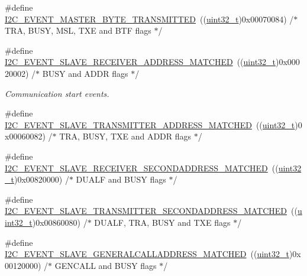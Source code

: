 \begin{DoxyCompactItemize}
\item 
\#define \hyperlink{group___i2_c___events_ga8fe3b96b54e3c38e1de5d48536039c8f}{I2\+C\+\_\+\+E\+V\+E\+N\+T\+\_\+\+M\+A\+S\+T\+E\+R\+\_\+\+B\+Y\+T\+E\+\_\+\+T\+R\+A\+N\+S\+M\+I\+T\+T\+ED}~((\hyperlink{_p_e___types_8h_a33594304e786b158f3fb30289278f5af}{uint32\+\_\+t})0x00070084)  /$\ast$ T\+R\+A, B\+U\+S\+Y, M\+S\+L, T\+X\+E and B\+T\+F flags $\ast$/
\item 
\#define \hyperlink{group___i2_c___events_ga6cf0e334704618b024eee604849f50f7}{I2\+C\+\_\+\+E\+V\+E\+N\+T\+\_\+\+S\+L\+A\+V\+E\+\_\+\+R\+E\+C\+E\+I\+V\+E\+R\+\_\+\+A\+D\+D\+R\+E\+S\+S\+\_\+\+M\+A\+T\+C\+H\+ED}~((\hyperlink{_p_e___types_8h_a33594304e786b158f3fb30289278f5af}{uint32\+\_\+t})0x00020002) /$\ast$ B\+U\+S\+Y and A\+D\+D\+R flags $\ast$/
\begin{DoxyCompactList}\small\item\em Communication start events. \end{DoxyCompactList}\item 
\#define \hyperlink{group___i2_c___events_ga3fa381c1fd9a95c8ae13c6cc402b1327}{I2\+C\+\_\+\+E\+V\+E\+N\+T\+\_\+\+S\+L\+A\+V\+E\+\_\+\+T\+R\+A\+N\+S\+M\+I\+T\+T\+E\+R\+\_\+\+A\+D\+D\+R\+E\+S\+S\+\_\+\+M\+A\+T\+C\+H\+ED}~((\hyperlink{_p_e___types_8h_a33594304e786b158f3fb30289278f5af}{uint32\+\_\+t})0x00060082) /$\ast$ T\+R\+A, B\+U\+S\+Y, T\+X\+E and A\+D\+D\+R flags $\ast$/
\item 
\#define \hyperlink{group___i2_c___events_ga17e78ab01fa980b3df10f8d9f6864c48}{I2\+C\+\_\+\+E\+V\+E\+N\+T\+\_\+\+S\+L\+A\+V\+E\+\_\+\+R\+E\+C\+E\+I\+V\+E\+R\+\_\+\+S\+E\+C\+O\+N\+D\+A\+D\+D\+R\+E\+S\+S\+\_\+\+M\+A\+T\+C\+H\+ED}~((\hyperlink{_p_e___types_8h_a33594304e786b158f3fb30289278f5af}{uint32\+\_\+t})0x00820000)  /$\ast$ D\+U\+A\+L\+F and B\+U\+S\+Y flags $\ast$/
\item 
\#define \hyperlink{group___i2_c___events_ga6221aa204356bec9146f800ccfc99fc1}{I2\+C\+\_\+\+E\+V\+E\+N\+T\+\_\+\+S\+L\+A\+V\+E\+\_\+\+T\+R\+A\+N\+S\+M\+I\+T\+T\+E\+R\+\_\+\+S\+E\+C\+O\+N\+D\+A\+D\+D\+R\+E\+S\+S\+\_\+\+M\+A\+T\+C\+H\+ED}~((\hyperlink{_p_e___types_8h_a33594304e786b158f3fb30289278f5af}{uint32\+\_\+t})0x00860080)  /$\ast$ D\+U\+A\+L\+F, T\+R\+A, B\+U\+S\+Y and T\+X\+E flags $\ast$/
\item 
\#define \hyperlink{group___i2_c___events_ga15195f6def95f688ae9725899f49ea23}{I2\+C\+\_\+\+E\+V\+E\+N\+T\+\_\+\+S\+L\+A\+V\+E\+\_\+\+G\+E\+N\+E\+R\+A\+L\+C\+A\+L\+L\+A\+D\+D\+R\+E\+S\+S\+\_\+\+M\+A\+T\+C\+H\+ED}~((\hyperlink{_p_e___types_8h_a33594304e786b158f3fb30289278f5af}{uint32\+\_\+t})0x00120000)  /$\ast$ G\+E\+N\+C\+A\+L\+L and B\+U\+S\+Y flags $\ast$/

\end{DoxyCompactItemize}
